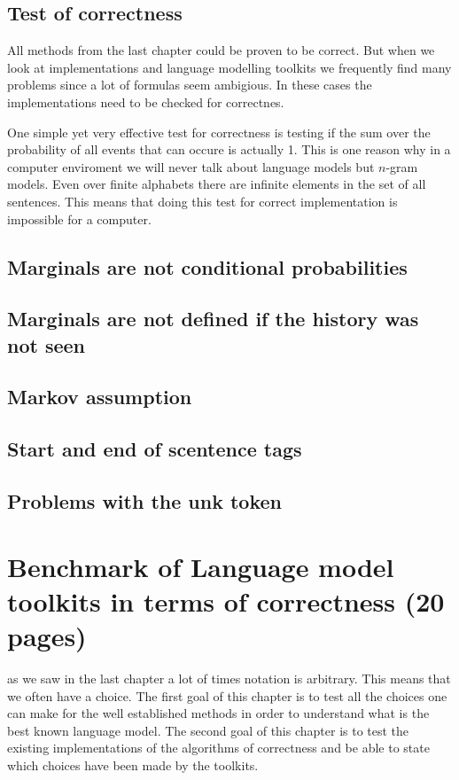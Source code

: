 \documentclass[•]{book}
\begin{document}
\section{Test of correctness}
All methods from the last chapter could be proven to be correct.
But when we look at implementations and language modelling toolkits we frequently find many problems since a lot of formulas seem ambigious. 
In these cases the implementations need to be checked for correctnes. 

One simple yet very effective test for correctness is testing if the sum over the probability of all events that can occure is actually 1. 
This is one reason why in a computer enviroment we will never talk about language models but $n$-gram models. 
Even over finite alphabets there are infinite elements in the set of all sentences. 
This means that doing this test for correct implementation is impossible for a computer.
\section{Marginals are not conditional probabilities}
\section{Marginals are not defined if the history was not seen}
\section{Markov assumption}
\section{Start and end of scentence tags}
\section{Problems with the unk token}

\chapter{Benchmark of Language model toolkits in terms of correctness (20 pages)}
as we saw in the last chapter a lot of times notation is arbitrary.
This means that we often have a choice. 
The first goal of this chapter is to test all the choices one can make for the well established methods in order to understand what is the best known language model. 
The second goal of this chapter is to test the existing implementations of the algorithms of correctness and be able to state which choices have been made by the toolkits.
\end{document}
